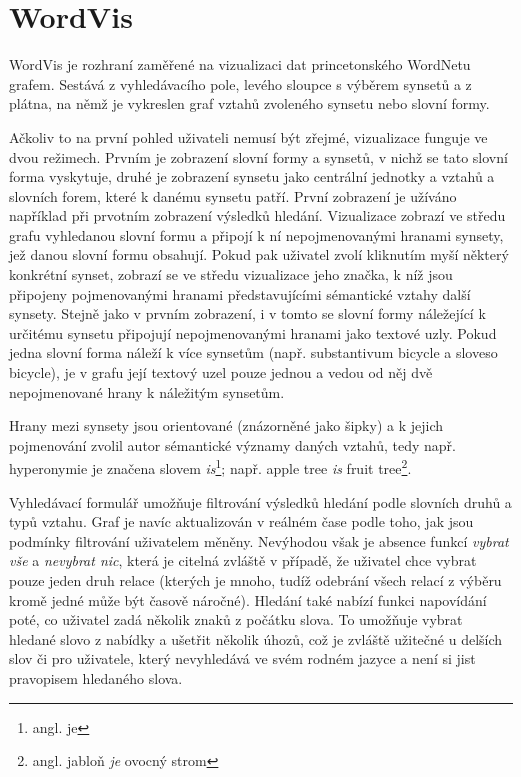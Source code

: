 \documentclass[a4paper, 11pt, oneside]{book}
\newcommand\ex{\textsf}
\begin{document}
			\section{WordVis}
			\label{vis:wordvis}

				WordVis je rozhraní zaměřené na vizualizaci dat princetonského WordNetu grafem. Sestává z vyhledávacího pole, levého sloupce s výběrem synsetů a z plátna, na němž je vykreslen graf vztahů zvoleného synsetu nebo slovní formy. 

				Ačkoliv to na první pohled uživateli nemusí být zřejmé, vizualizace funguje ve dvou režimech. Prvním je zobrazení slovní formy a synsetů, v nichž se tato slovní forma vyskytuje, druhé je zobrazení synsetu jako centrální jednotky a vztahů a slovních forem, které k danému synsetu patří. První zobrazení je užíváno například při prvotním zobrazení výsledků hledání. Vizualizace zobrazí ve středu grafu vyhledanou slovní formu a připojí k ní nepojmenovanými hranami synsety, jež danou slovní formu obsahují. Pokud pak uživatel zvolí kliknutím myší některý konkrétní synset, zobrazí se ve středu vizualizace jeho značka, k níž jsou připojeny pojmenovanými hranami představujícími sémantické vztahy další synsety. Stejně jako v prvním zobrazení, i v tomto se slovní formy náležející k určitému synsetu připojují nepojmenovanými hranami jako textové uzly. Pokud jedna slovní forma náleží k více synsetům (např. substantivum \ex{bicycle} a sloveso \ex{bicycle}), je v grafu její textový uzel pouze jednou a vedou od něj dvě nepojmenované hrany k náležitým synsetům. 

				Hrany mezi synsety jsou orientované (znázorněné jako šipky) a k jejich pojmenování zvolil autor sémantické významy daných vztahů, tedy např. hyperonymie je značena slovem \textit{is}\footnote{angl. je}; např. \ex{apple tree \textit{is} fruit tree}\footnote{angl. \ex{jabloň \textit{je} ovocný strom}}.

				Vyhledávací formulář umožňuje filtrování výsledků hledání podle slovních druhů a typů vztahu. Graf je navíc aktualizován v reálném čase podle toho, jak jsou podmínky filtrování uživatelem měněny. Nevýhodou však je absence funkcí \textit{vybrat vše} a \textit{nevybrat nic}, která je citelná zvláště v případě, že uživatel chce vybrat pouze jeden druh relace (kterých je mnoho, tudíž odebrání všech relací z výběru kromě jedné může být časově náročné). Hledání také nabízí funkci napovídání poté, co uživatel zadá několik znaků z počátku slova. To umožňuje vybrat hledané slovo z nabídky a ušetřit několik úhozů, což je zvláště užitečné u delších slov či pro uživatele, který nevyhledává ve svém rodném jazyce a není si jist pravopisem hledaného slova.
\end{document}
